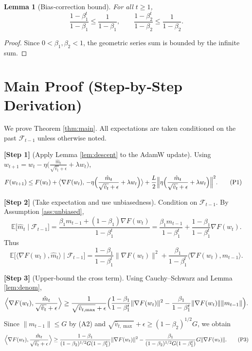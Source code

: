 \documentclass[11pt]{article}
\newtheorem{lemma}{Lemma}
\newcommand{\E}{\mathbb{E}}
\begin{document}
\begin{lemma}[Bias‑correction bound]\label{lem:bias}
For all $t\ge1$,
\[
\frac{1-\beta_{1}^{t}}{1-\beta_{1}} \le \frac{1}{1-\beta_{1}},\qquad
\frac{1-\beta_{2}^{t}}{1-\beta_{2}} \le \frac{1}{1-\beta_{2}}.
\]
\end{lemma}
\begin{proof}
Since $0<\beta_{1},\beta_{2}<1$, the geometric series sum is bounded by the infinite sum.
\hfill\qedhere
\end{proof}

\section*{Main Proof (Step‑by‑Step Derivation)}
We prove Theorem \ref{thm:main}. All expectations are taken conditioned on the past
$\mathcal{F}_{t-1}$ unless otherwise noted.

\medskip
\noindent\textbf{[Step 1]} (Apply Lemma \ref{lem:descent} to the AdamW update).  
Using $w_{t+1}=w_t-\eta\bigl(\frac{\hat{m}_t}{\sqrt{\hat{v}_t}+\epsilon}+\lambda w_t\bigr)$,
\begin{align}
F(w_{t+1})
&\le F(w_t) + \big\langle \nabla F(w_t),\,
      -\eta\Bigl(\frac{\hat{m}_t}{\sqrt{\hat{v}_t}+\epsilon}+\lambda w_t\Bigr) \big\rangle
   +\frac{L}{2}\Bigl\|\eta\Bigl(\frac{\hat{m}_t}{\sqrt{\hat{v}_t}+\epsilon}+\lambda w_t\Bigr)\Bigr\|^{2}.
\tag{P1}
\end{align}

\medskip
\noindent\textbf{[Step 2]} (Take expectation and use unbiasedness).  
Condition on $\mathcal{F}_{t-1}$. By Assumption \ref{ass:unbiased},
\[
\E\!\bigl[\hat{m}_t\mid\mathcal{F}_{t-1}\bigr]
   =\frac{\beta_{1}m_{t-1}+(1-\beta_{1})\nabla F(w_t)}{1-\beta_{1}^{t}}
   =\frac{\beta_{1}m_{t-1}}{1-\beta_{1}^{t}}
     +\frac{1-\beta_{1}}{1-\beta_{1}^{t}}\nabla F(w_t).
\]
Thus
\[
\E\!\bigl[\langle\nabla F(w_t),\hat{m}_t\rangle\mid\mathcal{F}_{t-1}\bigr]
 = \frac{1-\beta_{1}}{1-\beta_{1}^{t}}\|\nabla F(w_t)\|^{2}
   +\frac{\beta_{1}}{1-\beta_{1}^{t}}\langle\nabla F(w_t),m_{t-1}\rangle .
\tag{P2}
\]

\medskip
\noindent\textbf{[Step 3]} (Upper‑bound the cross term).  
Using Cauchy–Schwarz and Lemma \ref{lem:denom},
\[
\Bigl\langle \nabla F(w_t),\frac{\hat{m}_t}{\sqrt{\hat{v}_t}+\epsilon}\Bigr\rangle
 \ge \frac{1}{\sqrt{\hat{v}_{t,\max}}+\epsilon}
        \Bigl(\frac{1-\beta_{1}}{1-\beta_{1}^{t}}\|\nabla F(w_t)\|^{2}
              -\frac{\beta_{1}}{1-\beta_{1}^{t}} \|\nabla F(w_t)\|\|m_{t-1}\|\Bigr).
\]
Since $\|m_{t-1}\|\le G$ by (A2) and $\sqrt{\hat{v}_{t,\max}}+\epsilon\ge (1-\beta_{2})^{1/2}G$, we obtain
\[
\Bigl\langle \nabla F(w_t),\frac{\hat{m}_t}{\sqrt{\hat{v}_t}+\epsilon}\Bigr\rangle
 \ge \frac{1-\beta_{1}}{(1-\beta_{2})^{1/2}G(1-\beta_{1}^{t})}\|\nabla F(w_t)\|^{2}
        -\frac{\beta_{1}}{(1-\beta_{2})^{1/2}G(1-\beta_{1}^{t})}G\|\nabla F(w_t)\|.
\tag{P3}
\]
\end{document}
